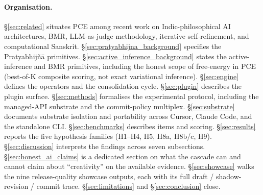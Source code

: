 \paragraph{Organisation.} \S\ref{sec:related} situates PCE among recent work on Indic-philosophical AI architectures, BMR, LLM-as-judge methodology, iterative self-refinement, and computational Sanskrit. \S\ref{sec:pratyabhijna_background} specifies the Pratyabhij\~n\=a primitives. \S\ref{sec:active_inference_background} states the active-inference and BMR primitives, including the honest scope of free-energy in PCE (best-of-K composite scoring, not exact variational inference). \S\ref{sec:engine} defines the operators and the consolidation cycle. \S\ref{sec:plugin} describes the plugin surface. \S\ref{sec:methods} formalises the experimental protocol, including the managed-API substrate and the commit-policy multiplex. \S\ref{sec:substrate} documents substrate isolation and portability across Cursor, Claude Code, and the standalone CLI. \S\ref{sec:benchmarks} describes items and scoring. \S\ref{sec:results} reports the five hypothesis families (H1--H4, H5, H8a, H8b/c, H9). \S\ref{sec:discussion} interprets the findings across seven subsections. \S\ref{sec:honest_ai_claims} is a dedicated section on what the cascade can and cannot claim about ``creativity'' on the available evidence. \S\ref{sec:showcase} walks the nine release-quality showcase outputs, each with its full draft / shadow-revision / commit trace. \S\ref{sec:limitations} and \S\ref{sec:conclusion} close.
